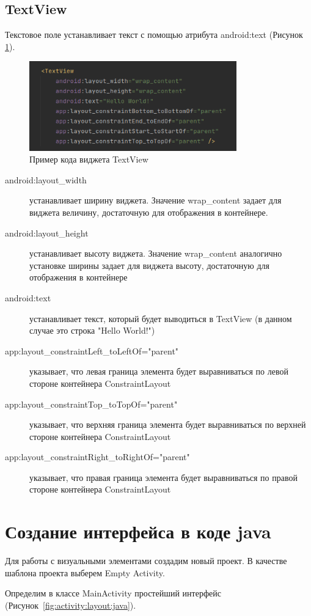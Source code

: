 \subsection{TextView}
Текстовое поле устанавливает текст с помощью атрибута android:text
(Рисунок \ref{fig:xml:textview}).

\begin{figure}[h!tp]
	\centering
	\includegraphics[width=0.8\textwidth]{Screenshot from 2023-03-09 17-49-55.png}
	\caption{Пример кода виджета TextView}
	\label{fig:xml:textview}
\end{figure}

\begin{description}
	\item[android:layout\_width] устанавливает ширину виджета. Значение
		wrap\_content задает для виджета величину, достаточную для
		отображения в контейнере.
	\item[android:layout\_height] устанавливает высоту виджета. Значение
		wrap\_content аналогично установке ширины задает для виджета высоту,
		достаточную для отображения в контейнере
	\item[android:text] устанавливает текст, который будет выводиться
		в TextView (в данном случае это строка "Hello World!")
	\item[app:layout\_constraintLeft\_toLeftOf="parent"] указывает, что левая
		граница элемента будет выравниваться по левой стороне контейнера
		ConstraintLayout
	\item[app:layout\_constraintTop\_toTopOf="parent"] указывает, что верхняя
		граница элемента будет выравниваться по верхней стороне контейнера
		ConstraintLayout
	\item[app:layout\_constraintRight\_toRightOf="parent"] указывает,
		что правая граница элемента будет выравниваться по правой стороне
		контейнера ConstraintLayout
\end{description}

\section{Создание интерфейса в коде java}
Для работы с визуальными элементами создадим новый проект. В качестве
шаблона проекта выберем Empty Activity.\par
Определим в классе MainActivity простейший интерфейс
(Рисунок~\ref{fig:activity:layout:java}).

